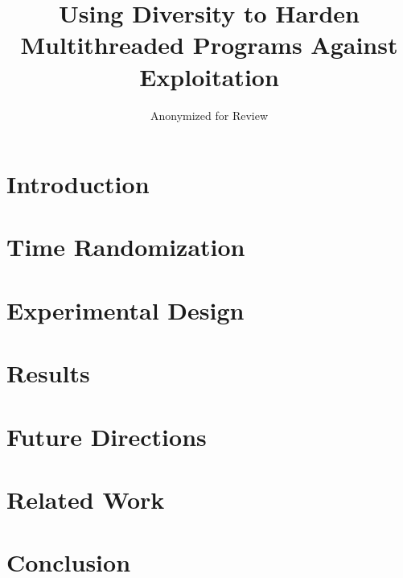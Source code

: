 \documentclass{llncs}
\begin{document}
%
\mainmatter              %
%
\title{Using Diversity to Harden Multithreaded Programs Against Exploitation}
%
\author{Anonymized for Review}
%

\maketitle              %

\begin{abstract}

\end{abstract}
%
\section{Introduction}


\section{Time Randomization}


\section{Experimental Design}


\section{Results}\label{results}


\section{Future Directions}


\section{Related Work}


\section{Conclusion}



%
%
{\footnotesize 
}
\end{document}
